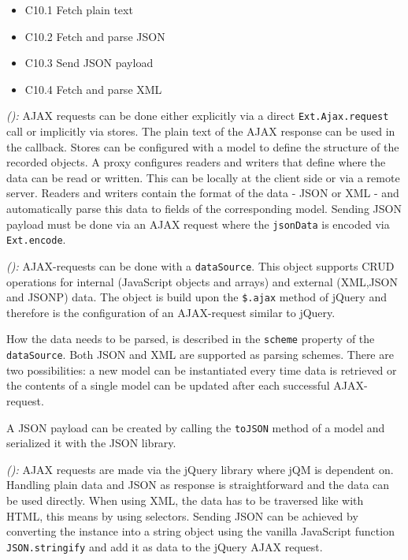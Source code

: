 \documentclass[a4paper]{artikel3}
\newcommand{\code}[1]{\texttt{#1}}
\newcommand{\setspace}[0]{\vspace{2mm}}
\renewcommand{\paragraph}[1]{\setspace \noindent {\bf #1}  }
\newcommand{\framework}[2]{ \emph{#1 (\textbf{#2}): }} %
\newcommand{\challenge}[1]{\paragraph{#1}}
\begin{document}

\challenge{\chal{ajax}}
\begin{itemize}
  \item C10.1 Fetch plain text
  \item C10.2 Fetch and parse JSON
  \item C10.3 Send JSON payload
  \item C10.4 Fetch and parse XML
\end{itemize}

\framework{\sta{}}{}
AJAX requests can be done either explicitly via a direct \code{Ext.Ajax.request} call or implicitly via stores.  
The plain text of the AJAX response can be used in the callback.   
Stores can be configured with a model to define the structure of the recorded objects.  
A proxy configures readers and writers that define where the data can be read or written.  
This can be locally at the client side or via a remote server.  
Readers and writers contain the format of the data - JSON or XML - and automatically parse this data to fields of the corresponding model. 
Sending JSON payload must be done via an AJAX request where the \code{jsonData} is encoded via \code{Ext.encode}.

\framework{\kendoa{}}{}
AJAX-requests can be done with a \code{dataSource}.
This object supports CRUD operations for internal (JavaScript objects and arrays) and external (XML,JSON and JSONP) data.
The object is build upon the \code{\$.ajax} method of jQuery and therefore is the configuration of an AJAX-request similar to jQuery.

How the data needs to be parsed, is described in the \code{scheme} property of the \code{dataSource}.
Both JSON and XML are supported as parsing schemes.
There are two possibilities:  a new model can be instantiated every time data is retrieved or the contents of a single model can be updated after each successful AJAX-request.

A JSON payload can be created by calling the \code{toJSON} method of a model and serialized it with the JSON library.

\framework{\jqma{}}{}
AJAX requests are made via the jQuery library where jQM is dependent on.
Handling plain data and JSON as response is straightforward and the data can be used directly.
When using XML, the data has to be traversed like with HTML, this means by using selectors.
Sending JSON can be achieved by converting the instance into a string object using the vanilla JavaScript function \code{JSON.stringify} and add it as data to the jQuery AJAX request.
\end{document}
